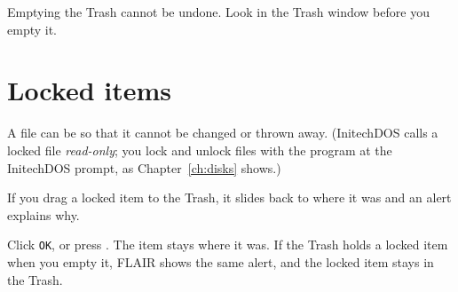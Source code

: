 
\begin{MacWarning}
Emptying the Trash cannot be undone.  Look in the Trash window before you
empty it.
\end{MacWarning}

\section{Locked items}
A file can be  so that it cannot be changed or thrown away.
(InitechDOS calls a locked file \textit{read-only}; you lock and unlock
files with the  program at the InitechDOS prompt, as
Chapter~\ref{ch:disks} shows.)

If you drag a locked item to the Trash, it slides back to where it was and
an alert explains why.


Click \texttt{OK}, or press .  The item stays where it was.  If the Trash holds a
locked item when you empty it, FLAIR shows the same alert, and the locked
item stays in the Trash.

